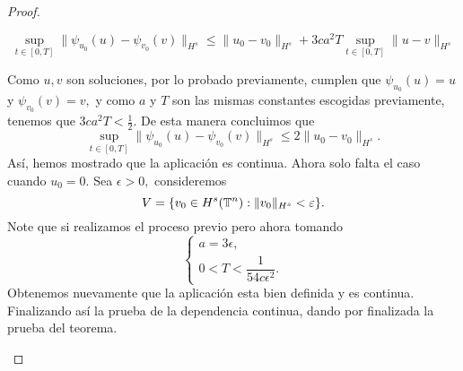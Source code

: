 \begin{proof}
\begin{itemize}
       $$\sup_{t\in[0,T]}\|\psi_{u_0}(u)-\psi_{v_0}(v)\|_{H^s}\leq\|u_0-v_0\|_{H^s}+3ca^2T\sup_{t\in[0,T]}\|u-v\|_{H^s}$$

       Como $u,v$ son soluciones, por lo probado previamente, cumplen que $\psi_{u_0}(u)=u$ y $\psi_{v_0}(v)=v,$ y como $a$ y $T$ son las mismas constantes escogidas previamente, tenemos que $3ca^2T<\frac{1}{2}.$ De esta manera concluimos que
       $$\sup_{t\in[0,T]}\|\psi_{u_0}(u)-\psi_{v_0}(v)\|_{H^s}\leq2\|u_0-v_0\|_{H^s}.$$
       Así, hemos mostrado que la aplicación es continua. Ahora solo falta el caso cuando $u_0=0.$ Sea $\epsilon>0,$ consideremos 
       $$V=\{v_0\in H^s(\mathbb{T}^n):\|v_0\|_{H^s}<\varepsilon\}.$$
       Note que si realizamos el proceso previo pero ahora tomando
       $$\begin{cases}
           a=3\epsilon,\\
           0<T<\dfrac{1}{54c\epsilon^2}.
       \end{cases}$$
       Obtenemos nuevamente que la aplicación esta bien definida y es continua. Finalizando así la prueba de la dependencia continua, dando por finalizada la prueba del teorema.



       


   \end{itemize}   
\end{proof}


